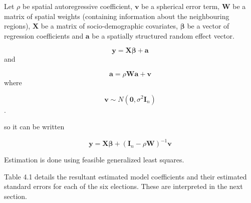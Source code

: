 \documentclass[openany]{book}
\begin{document}
Let \(\rho\) be spatial autoregressive coefficient, \(\boldsymbol v\) be a spherical error term, \({\boldsymbol W}\) be a matrix of spatial weights (containing information about the neighbouring regions), \(\boldsymbol X\) be a matrix of socio-demographic covariates, \(\boldsymbol \beta\) be a vector of regression coefficients and \(\boldsymbol a\) be a spatially structured random effect vector.

\[{\boldsymbol y} = {\boldsymbol X} {\boldsymbol \beta} + {\boldsymbol a}\]
and

\[{\boldsymbol a} = \rho {\boldsymbol W} {\boldsymbol a} + {\boldsymbol v}\]
where

\[{\boldsymbol v} \sim N({\boldsymbol 0}, \sigma^2 {\boldsymbol I_n})\].

so it can be written

\[{\boldsymbol y} = {\boldsymbol X} {\boldsymbol \beta} + ({\boldsymbol I}_n-\rho {\boldsymbol W})^{-1}{\boldsymbol v}\]

Estimation is done using feasible generalized least squares.

Table 4.1 details the resultant estimated model coefficients and their estimated standard errors for each of the six elections. These are interpreted in the next section.
\end{document}

